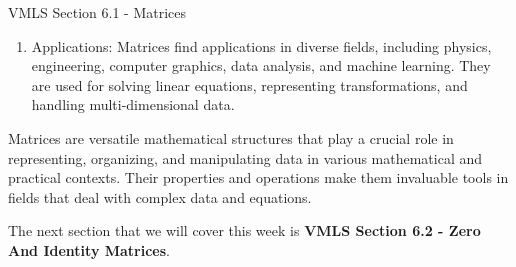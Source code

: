 \begin{notes}{VMLS Section 6.1 - Matrices}
\begin{enumerate}
        \item Applications: Matrices find applications in diverse fields, including physics, engineering, computer graphics, data analysis, and machine learning. They are used for solving linear 
        equations, representing transformations, and handling multi-dimensional data.
    \end{enumerate}

    Matrices are versatile mathematical structures that play a crucial role in representing, organizing, and manipulating data in various mathematical and practical contexts. Their properties and 
    operations make them invaluable tools in fields that deal with complex data and equations.
\end{notes}

The next section that we will cover this week is \textbf{VMLS Section 6.2 - Zero And Identity Matrices}.

